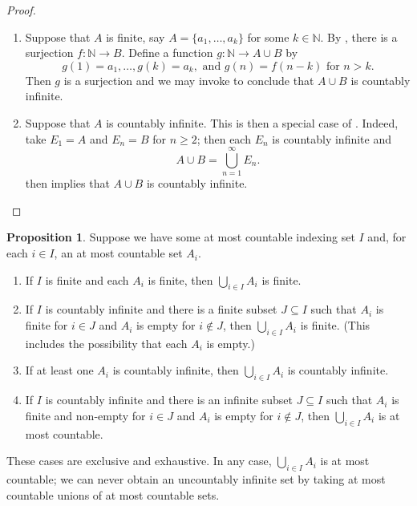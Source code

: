 \documentclass[12pt]{article}
\theoremstyle{definition}
\newtheorem{proposition}[definition]{Proposition}
\begin{document}
\begin{proof}
    \begin{enumerate}[label = (\roman*)]
        \item Suppose that \( A \) is finite, say \( A = \{ a_1, \ldots, a_k \} \) for some \( k \in \mathbb{N} \). By , there is a surjection \( f : \mathbb{N} \to B \). Define a function \( g : \mathbb{N} \to A \cup B \) by
        \[
            g(1) = a_1, \ldots, g(k) = a_k, \text{ and  } g(n) = f(n - k) \text{ for } n > k.
        \]
        Then \( g \) is a surjection and we may invoke  to conclude that \( A \cup B \) is countably infinite.

        \item Suppose that \( A \) is countably infinite. This is then a special case of . Indeed, take \( E_1 = A \) and \( E_n = B \) for \( n \geq 2 \); then each \( E_n \) is countably infinite and
        \[
            A \cup B = \bigcup_{n=1}^{\infty} E_n.
        \]
         then implies that \( A \cup B \) is countably infinite. \qedhere
    \end{enumerate}
\end{proof}

\begin{proposition}
\label{prop:amc_union_of_amc_sets_is_amc}
    Suppose we have some at most countable indexing set \( I \) and, for each \( i \in I \), an at most countable set \( A_i \).
    \begin{enumerate}[label = (\roman*)]
        \item If \( I \) is finite and each \( A_i \) is finite, then \( \bigcup_{i \in I} A_i \) is finite.
        
        \item If \( I \) is countably infinite and there is a finite subset \( J \subseteq I \) such that \( A_i \) is finite for \( i \in J \) and \( A_i \) is empty for \( i \not\in J \), then \( \bigcup_{i \in I} A_i \) is finite. (This includes the possibility that each \( A_i \) is empty.)
        
        \item If at least one \( A_i \) is countably infinite, then \( \bigcup_{i \in I} A_i \) is countably infinite.

        \item If \( I \) is countably infinite and there is an infinite subset \( J \subseteq I \) such that \( A_i \) is finite and non-empty for \( i \in J \) and \( A_i \) is empty for \( i \not\in J \), then \( \bigcup_{i \in I} A_i \) is at most countable.
    \end{enumerate}
    These cases are exclusive and exhaustive. In any case, \( \bigcup_{i \in I} A_i \) is at most countable; we can never obtain an uncountably infinite set by taking at most countable unions of at most countable sets.
\end{proposition}
\end{document}
